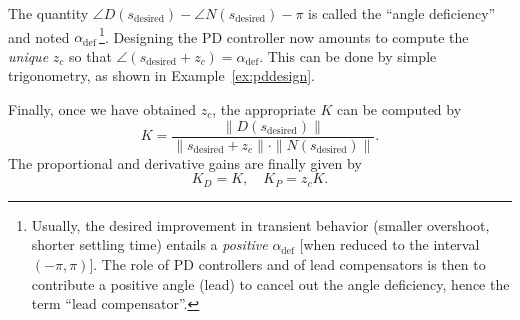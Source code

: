 \documentclass[a4paper,11pt]{report}
\theoremstyle{definition}
\newcommand{\des}{\textrm{desired}}
\begin{document}
The quantity $\angle D(s_\des)-\angle N(s_\des) - \pi$ is called the
``angle deficiency'' and noted
$\alpha_\mathrm{def}$\,\footnote{Usually, the desired improvement in
  transient behavior (smaller overshoot, shorter settling time)
  entails a \emph{positive} $\alpha_\mathrm{def}$ [when reduced to the
  interval $(-\pi,\pi)$]. The role of PD controllers and of lead
  compensators is then to contribute a positive angle (lead) to cancel
  out the angle deficiency, hence the term ``lead
  compensator''.}. Designing the PD controller now amounts to compute
the \emph{unique} $z_c$ so that
$\angle(s_\des+z_c)=\alpha_\mathrm{def}$. This can be done by simple
trigonometry, as shown in Example~\ref{ex:pddesign}.

Finally, once we have obtained $z_c$, the appropriate $K$ can be
computed by
\[
K = \frac{\|D(s_\des)\|}{\|s_\des+z_c\|\cdot\|N(s_\des)\|}.
\]
The proportional and derivative gains are finally given by
\[
K_D = K,\quad K_P = z_cK.
\]
\end{document}
